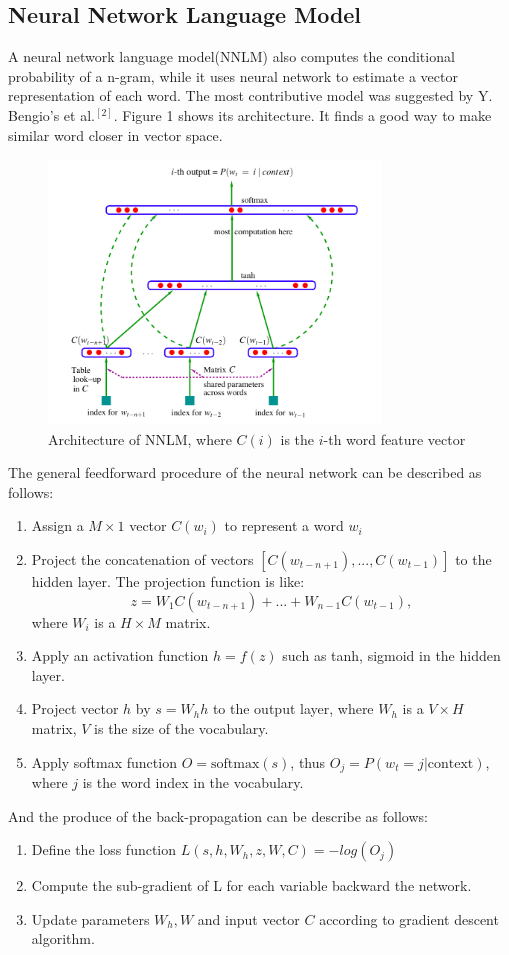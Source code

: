 \documentclass[11pt, oneside]{article}   	%
\begin{document}
\subsection{Neural Network Language Model}
A neural network language model(NNLM) also computes the conditional probability of a n-gram, while it uses neural network to estimate a vector representation of each word. The most contributive model was suggested by Y. Bengio's et al.$^{[2]}$. Figure 1 shows its architecture. It finds a good way to make similar word closer in vector space.
\begin{figure}
\centering
\includegraphics[width=250pt]{nnlm.png}
\caption{Architecture of NNLM, where $C(i)$ is the $i$-th word feature vector}
\end{figure}
The general feedforward procedure of the neural network can be described as follows: 
\begin{enumerate}
\item Assign a $M \times 1$ vector $C(w_i)$ to represent a word $w_i$
\item Project the concatenation of vectors $[C(w_{t-n+1}),...,C(w_{t-1})]$ to the hidden layer. The projection function is like:
\[z=W_1C(w_{t-n+1}) + ... + W_{n-1}C(w_{t-1}),
\] where  $W_i$ is a $H\times M$ matrix.
\item Apply an activation function $h=f(z)$ such as tanh, sigmoid in the hidden layer.
\item Project  vector $h$ by $s=W_hh$ to the output layer, where $W_h$ is a $V\times H$ matrix, $V$ is the size of the vocabulary.
\item Apply softmax function $O=\text{softmax}(s)$, thus $O_j =P(w_t=j|\text{context})$, where $j$ is the word index in the vocabulary. 
\end{enumerate}
And the produce of the back-propagation can be describe as follows:
\begin{enumerate}
\item Define the loss function $L(s,h,W_h,z,W,C)=-log(O_j)$ 
\item Compute the sub-gradient of L for each variable backward the network.
\item Update parameters $W_h,W$ and input vector $C$ according to gradient descent algorithm.
\end{enumerate}
\end{document}
